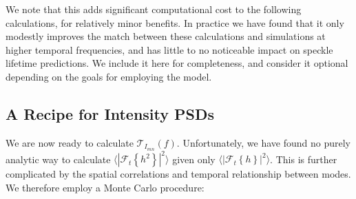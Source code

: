 \documentclass[10pt,preprint]{aastex631}
\begin{document}
We note that this adds significant computational cost to the following calculations, for relatively minor benefits.  In practice we have found that it only modestly improves the match between these calculations and simulations at higher temporal frequencies, and has little to no noticeable impact on speckle lifetime predictions.  We include it here for completeness, and consider it optional depending on the goals for employing the model.

\subsection{A Recipe for Intensity PSDs}
\label{sec:recipe}
We are now ready to calculate $\mathcal{T}_{I_{mn}}(f)$.  Unfortunately, we have found no purely analytic way to calculate $\langle \left| \mathcal{F}_t\left\{ h^2 \right\} \right|^2 \rangle$ given only $\langle \left| \mathcal{F}_t\left\{ h \right\} \right|^2 \rangle$.  This is further complicated by the spatial correlations and temporal relationship between modes.  We therefore employ a Monte Carlo procedure:
\end{document}
